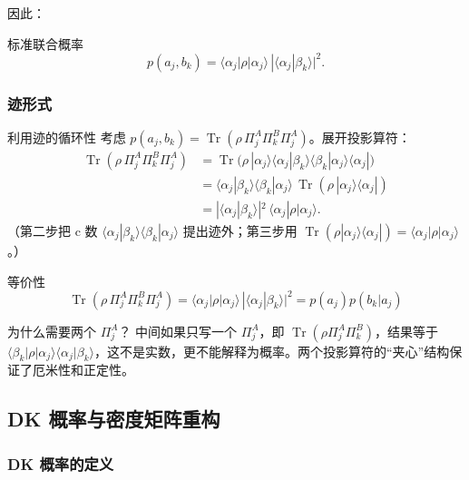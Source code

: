 因此：
\begin{formulabox}{标准联合概率}
\[
  p(a_j,b_k) = \langle\alpha_j|\rho|\alpha_j\rangle\,|\langle\alpha_j|\beta_k\rangle|^2.
\]
\end{formulabox}

\subsubsection{迹形式}

\begin{derivationbox}{利用迹的循环性}
考虑 $p(a_j,b_k)=\operatorname{Tr}(\rho\,\Pi_j^A\Pi_k^B\Pi_j^A)$。展开投影算符：
\begin{align*}
  \operatorname{Tr}(\rho\,\Pi_j^A\Pi_k^B\Pi_j^A)
  &= \operatorname{Tr}\bigl(\rho\,|\alpha_j\rangle\langle\alpha_j|\beta_k\rangle\langle\beta_k|\alpha_j\rangle\langle\alpha_j|\bigr) \\
  &= \langle\alpha_j|\beta_k\rangle\langle\beta_k|\alpha_j\rangle\,
     \operatorname{Tr}(\rho\,|\alpha_j\rangle\langle\alpha_j|) \\
  &= |\langle\alpha_j|\beta_k\rangle|^2\,\langle\alpha_j|\rho|\alpha_j\rangle.
\end{align*}
（第二步把 c 数 $\langle\alpha_j|\beta_k\rangle\langle\beta_k|\alpha_j\rangle$ 提出迹外；第三步用 $\operatorname{Tr}(\rho|\alpha_j\rangle\langle\alpha_j|)=\langle\alpha_j|\rho|\alpha_j\rangle$。）
\end{derivationbox}

\begin{formulabox}{等价性}
\[
  \boxed{\operatorname{Tr}(\rho\,\Pi_j^A\Pi_k^B\Pi_j^A) = \langle\alpha_j|\rho|\alpha_j\rangle\,|\langle\alpha_j|\beta_k\rangle|^2 = p(a_j)p(b_k|a_j)}
\]
\end{formulabox}

\begin{tipbox}{为什么需要两个 $\Pi_j^A$？}
中间如果只写一个 $\Pi_j^A$，即 $\operatorname{Tr}(\rho\Pi_j^A\Pi_k^B)$，结果等于 $\langle\beta_k|\rho|\alpha_j\rangle\langle\alpha_j|\beta_k\rangle$，这不是实数，更不能解释为概率。两个投影算符的``夹心''结构保证了厄米性和正定性。
\end{tipbox}


\subsection{DK 概率与密度矩阵重构}

\subsubsection{DK 概率的定义}

